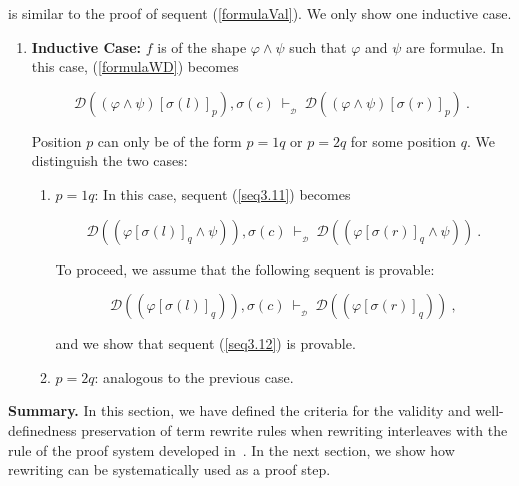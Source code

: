 \documentclass[copyright]{eptcs}
\begin{document}
\begin{enumerate}
is similar to the proof of sequent (\ref{formulaVal}). We only show one inductive case.
\begin{enumerate}
\item \textbf{Inductive Case:} $f$ is of the shape $\varphi \land \psi$ such that $\varphi$ and $\psi$ are formulae. In this case, (\ref{formulaWD}) becomes
\begin{small}
\begin{equation}
\mathcal{D}((\varphi \land \psi)[\sigma(l)]_p), \sigma(c)~\vdash_{_\mathcal{D}}~\mathcal{D}((\varphi \land \psi)[\sigma(r)]_p)~.\label{seq3.11}
\end{equation}
\end{small}
Position $p$ can only be of the form $p=1q$ or $p=2q$ for some position $q$. We distinguish the two cases:
\begin{enumerate}
\item $p=1q$: In this case, sequent (\ref{seq3.11}) becomes
\begin{small}
\begin{equation}
\mathcal{D}((\varphi[\sigma(l)]_q \land \psi)), \sigma(c)~\vdash_{_\mathcal{D}}~\mathcal{D}((\varphi[\sigma(r)]_q \land \psi))~.\label{seq3.12}
\end{equation}
\end{small}
To proceed, we assume that the following sequent is provable:
\begin{small}
\begin{equation}
\mathcal{D}((\varphi[\sigma(l)]_q)), \sigma(c)~\vdash_{_\mathcal{D}}~\mathcal{D}((\varphi[\sigma(r)]_q))~,\label{seq3.13}
\end{equation}
\end{small}
and we show that sequent (\ref{seq3.12}) is provable.
\item $p=2q$: analogous to the previous case.
\end{enumerate}
\end{enumerate}
\end{enumerate}

\textbf{Summary.} In this section, we have defined the criteria for the validity and well-definedness preservation of term rewrite rules when rewriting interleaves with the rule of the proof system developed in~\cite{icfemMehta08}. In the next section, we show how rewriting can be systematically used as a proof step.
\end{document}
